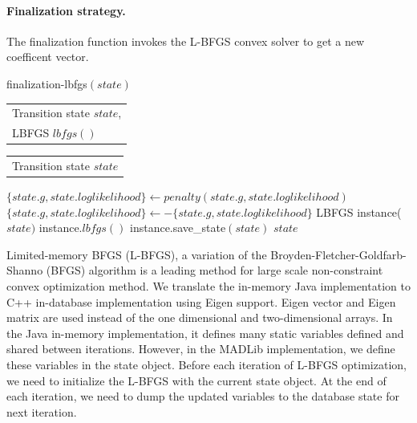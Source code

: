\documentclass[11pt,letterpaper]{article}
\newlength{\alglabelwidth}
\newcommand{\alginput}[1]{%
\par\noindent%
\settowidth{\alglabelwidth}{\emph{Output:}}%
\makebox[\alglabelwidth][l]{\emph{Input:}} \begin{tabular}[t]{l} #1 \end{tabular}}
\newcommand{\algoutput}[1]{%
\par\noindent%
\settowidth{\alglabelwidth}{\emph{Output:}}%
\makebox[\alglabelwidth][l]{\emph{Output:}} \begin{tabular}[t]{l} #1 \end{tabular}}
\begin{document}
\paragraph{Finalization strategy.}
The finalization function invokes the L-BFGS convex solver to get a new coefficent vector.\\
\begin{algorithm}
\caption{finalization-lbfgs$(state)$} \label{alg:CRF training}
\alginput{Transition state $state$,\\
LBFGS $\mathit{lbfgs}()$}
\algoutput{Transition state $state$}
\begin{algorithmic}[1]
        \State $\{state.g,state.loglikelihood\} \gets penalty(state.g,state.loglikelihood)$ 
        \State $\{state.g,state.loglikelihood\}\gets-\{state.g,state.loglikelihood\}$ 
        \State LBFGS instance($state)$ 
        \State instance.$lbfgs()$ 
        \State instance.save\_state$(state)$ 
        \State \Return $state$
\end{algorithmic}
\label{algo:crffinal}
\end{algorithm}

Limited-memory BFGS (L-BFGS), a variation of the Broyden-Fletcher-Goldfarb-Shanno (BFGS)
algorithm is a leading method for large scale non-constraint convex optimization method.
We translate the in-memory Java implementation to C++ in-database implementation using Eigen support.
Eigen vector and Eigen matrix are used instead of the one dimensional and two-dimensional arrays.
In the Java in-memory implementation, it defines many static variables defined and shared between iterations.
However, in the MADLib implementation, we define these variables in the state object.
Before each iteration of L-BFGS optimization, we need to initialize the L-BFGS with the current state object. 
At the end of each iteration, we need to dump the updated variables to the database state for next iteration.
\end{document}
